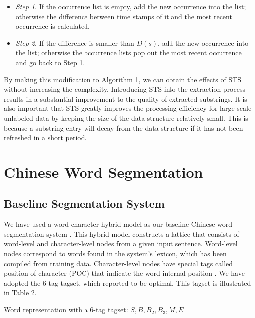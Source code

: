 \documentclass[english]{jnlp_1.4}
\begin{document}
\begin{itemize}
\item {\it Step 1}. If the occurrence list is empty, add the new occurrence into the list; otherwise the difference between time stamps of it and the most recent occurrence is calculated.
\item {\it Step 2}. If the difference is smaller than $D(s)$, add the new occurrence into the list; otherwise the occurrence lists pop out the most recent occurrence and go back to Step 1.
\end{itemize}

By making this modification to Algorithm 1, we can obtain the effects of STS without increasing the complexity.
Introducing STS into the extraction process results in a substantial improvement to the quality of extracted substrings. It is also important that STS greatly improves the processing efficiency for large scale unlabeled data by keeping the size of the data structure relatively small. This is because a substring entry will decay from the data structure if it has not been refreshed in a short period.


\section{Chinese Word Segmentation}

\subsection{Baseline Segmentation System}

We have used a word-character hybrid model as our baseline Chinese word segmentation system \cite{nakagawa2007hybrid,kruengkrai2009error,kruengkrai2009joint}. This hybrid model constructs a lattice that consists of word-level and character-level nodes from a given input sentence. Word-level nodes correspond to words found in the system's lexicon, which has been compiled from training data. Character-level nodes have special tags called position-of-character (POC) that indicate the word-internal position \cite{asahara2003corpus,nakagawa2004chinese}. We have adopted the 6-tag tagset, which \cite{zhao2006effective} reported to be optimal. This tagset is illustrated in Table 2.

\begin{table}[b]
\caption{Word representation with a 6-tag tagset: $S,B,B_2,B_3,M,E$}

\end{table}
\end{document}
